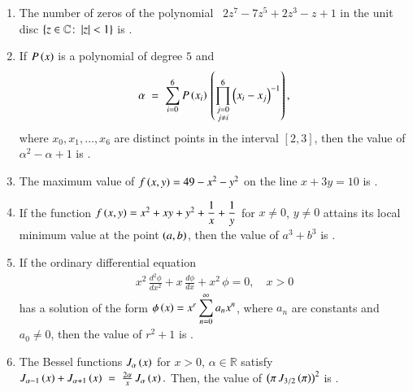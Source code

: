 \documentclass[journal,12pt,onecolumn]{IEEEtran}
\theoremstyle{remark}
\begin{document}
\begin{enumerate}
\item The number of zeros of the polynomial ~$2z^{7} - 7z^{5} + 2z^{3} - z + 1$ in the unit disc $\{z \in \mathbb{C} \colon \left\vert z\right\vert < 1\}$ is \underline{\hspace{2cm}}.

\hfill{}

\item If $P\left(x\right)$ is a polynomial of degree $5$ and
\begin{align*}
\alpha \;=\; \sum_{i=0}^{6} P\left(x_{i}\right) \,\left(\prod_{\substack{j=0 \\ j\ne i}}^{6} \left(x_{i}-x_{j}\right)^{-1}\right),
\end{align*}
where $x_{0}, x_{1}, \dots, x_{6}$ are distinct points in the interval $[2,3]$, then the value of $\alpha^{2}-\alpha+1$ is \underline{\hspace{2cm}}.

\hfill{}

\item The maximum value of $f\left(x,y\right) = 49 - x^{2} - y^{2}$ on the line $x + 3y = 10$ is \underline{\hspace{2cm}}.

\hfill{}

\item If the function $f\left(x,y\right) = x^{2} + xy + y^{2} + \dfrac{1}{x} + \dfrac{1}{y}$ for $x \ne 0$, $y \ne 0$ attains its local minimum value at the point $\left(a,b\right)$, then the value of $a^{3}+b^{3}$ is  \underline{\hspace{2cm}}.

\hfill{}

\item If the ordinary differential equation
\begin{align*}
x^{2}\,\frac{d^{2}\phi}{dx^{2}} + x\,\frac{d\phi}{dx} + x^{2}\,\phi = 0,\quad x>0
\end{align*}
has a solution of the form $\phi\left(x\right) = x^{r}\displaystyle\sum_{n=0}^{\infty} a_{n}x^{n}$, where $a_{n}$ are constants and $a_{0}\ne 0$, then the value of $r^{2}+1$ is \underline{\hspace{2cm}}.

\hfill{}

\item The Bessel functions $J_{\alpha}\left(x\right)$ for $x>0$, $\alpha \in \mathbb{R}$ satisfy
$J_{\alpha-1}\left(x\right) + J_{\alpha+1}\left(x\right) \;=\; \frac{2\alpha}{x}\,J_{\alpha}\left(x\right).$
Then, the value of $\left(\pi\,J_{3/2}\left(\pi\right)\right)^{2}$ is \underline{\hspace{2cm}}.


\end{enumerate}
\end{document}
